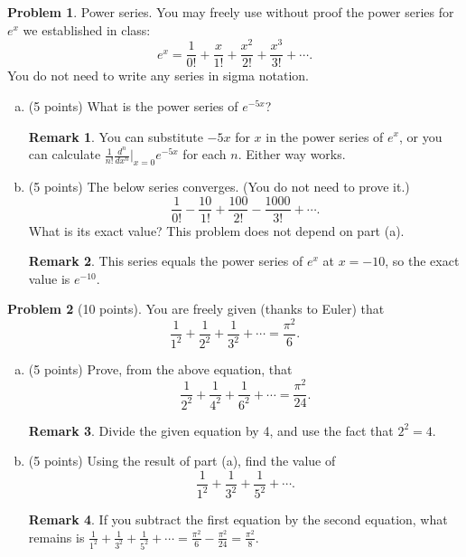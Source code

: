 \documentclass[11pt,oneside]{amsart}
\theoremstyle{definition}
\newtheorem{problem}{Problem}
\newtheorem*{remark}{Remark}
\begin{document}
\begin{problem}
Power series. You may freely use without proof the power series for $e^x$ we established in class:
\[e^x=\frac 1{0!}+\frac x{1!}+\frac{x^2}{2!}+\frac{x^3}{3!}+\cdots.\]
You do not need to write any series in sigma notation.
\begin{enumerate}[(a)]
  \item (5 points) What is the power series of $e^{-5x}$?
        \begin{remark}
          You can substitute $-5x$ for $x$ in the power series of $e^x$, or you can calculate $\frac 1{n!}\frac{d^n}{dx^n}\Big|_{x=0}e^{-5x}$ for each $n$. Either way works.
        \end{remark}
        \vfill
  \item (5 points) The below series converges. (You do not need to prove it.)
        \[\frac 1{0!}-\frac {10}{1!}+\frac {100}{2!}-\frac {1000}{3!}+\cdots.\]
        What is its exact value? This problem does not depend on part (a).
        \begin{remark}
          This series equals the power series of $e^x$ at $x=-10$, so the exact value is $e^{-10}$.
        \end{remark}
        \vfill

\end{enumerate}
\end{problem}

\newpage

\begin{problem}[10 points]
You are freely given (thanks to Euler) that
\[\frac 1{1^2}+\frac 1{2^2}+\frac 1{3^2}+\cdots=\frac{\pi^2}6.\]
\begin{enumerate}[(a)]
  \item (5 points) Prove, from the above equation, that
        \[\frac 1{2^2}+\frac 1{4^2}+\frac 1{6^2}+\cdots=\frac{\pi^2}{24}.\]
        \begin{remark}
          Divide the given equation by 4, and use the fact that $2^2=4$.
        \end{remark}
        \vfill
  \item (5 points) Using the result of part (a), find the value of
        \[\frac 1{1^2}+\frac 1{3^2}+\frac 1{5^2}+\cdots.\]
        \begin{remark}
          If you subtract the first equation by the second equation, what remains is $\frac 1{1^2}+\frac 1{3^2}+\frac 1{5^2}+\cdots=\frac{\pi^2}6-\frac{\pi^2}{24}=\frac{\pi^2}8$.
        \end{remark}
        \vfill
\end{enumerate}
\end{problem}
\end{document}

